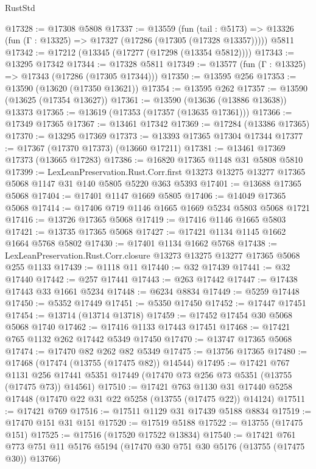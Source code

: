 \begin{lexlean}{RustStd}
\begin{coremodule}
@17328 := @17308 @5808
@17337 := @13559
    (fun (tail : @5173) => @13326 (fun (Γ : @13325) => @17327 (@17286 (@17305 (@17328 @13357)))))
    @5811
@17342 := @17212 (@13345 (@17277 (@17298 (@13354 @5812))))
@17343 := @13295 @17342
@17344 := @17328 @5811
@17349 := @13577 (fun (Γ : @13325) => @17343 (@17286 (@17305 @17344)))
@17350 := @13595 @256
@17353 := @13590 (@13620 (@17350 @13621))
@17354 := @13595 @262
@17357 := @13590 (@13625 (@17354 @13627))
@17361 := @13590 (@13636 (@13886 @13638)) @13373
@17365 := @13619 (@17353 (@17357 (@13635 @17361)))
@17366 := @17349 @17365
@17367 := @13461 @17342
@17369 := @17284 (@13386 @17365)
@17370 := @13295 @17369
@17373 := @13393 @17365 @17304 @17344
@17377 := @17367 (@17370 @17373) (@13660 @17211)
@17381 := @13461 @17369 @17373 (@13665 @17283)
@17386 := @16820 @17365 @1148 @31 @5808 @5810
@17399 := LexLeanPreservation.Rust.Corr.first
    @13273
    @13275
    @13277
    @17365
    @5068
    @1147
    @31
    @140
    @5805
    @5220
    @363
    @5393
@17401 := @13688 @17365 @5068
@17404 := @17401 @1147 @1669 @5805
@17406 := @14049 @17365 @5068
@17414 := @17406 @719 @1146 @1665 @1669 @5234 @5803 @5068 @1721
@17416 := @13726 @17365 @5068
@17419 := @17416 @1146 @1665 @5803
@17421 := @13735 @17365 @5068
@17427 := @17421 @1134 @1145 @1662 @1664 @5768 @5802
@17430 := @17401 @1134 @1662 @5768
@17438 := LexLeanPreservation.Rust.Corr.closure @13273 @13275 @13277 @17365 @5068 @255 @1133
@17439 := @1118 @11
@17440 := @32 @17439
@17441 := @32 @17440
@17442 := @257 @17441
@17443 := @263 @17442
@17447 := @17438 @17443 @33 @1661 @5234
@17448 := @6234 @8834
@17449 := @5259 @17448
@17450 := @5352 @17449
@17451 := @5350 @17450
@17452 := @17447 @17451
@17454 := @13714 (@13714 @13718)
@17459 := @17452 @17454 @30 @5068 @5068 @1740
@17462 := @17416 @1133 @17443 @17451
@17468 := @17421 @765 @1132 @262 @17442 @5349 @17450
@17470 := @13747 @17365 @5068
@17474 := @17470 @82 @262 @82 @5349
@17475 := @13756 @17365
@17480 := @17468 (@17474 (@13755 (@17475 @82)) @14544)
@17495 := @17421
    @767
    @1131
    @256
    @17441
    @5351
    @17449
    (@17470 @73 @256 @73 @5351 (@13755 (@17475 @73)) @14561)
@17510 := @17421
    @763
    @1130
    @31
    @17440
    @5258
    @17448
    (@17470 @22 @31 @22 @5258 (@13755 (@17475 @22)) @14124)
@17511 := @17421 @769
@17516 := @17511 @1129 @31 @17439 @5188 @8834
@17519 := @17470 @151 @31 @151
@17520 := @17519 @5188
@17522 := @13755 (@17475 @151)
@17525 := @17516 (@17520 @17522 @13834)
@17540 := @17421
    @761
    @773
    @751
    @11
    @5176
    @5194
    (@17470 @30 @751 @30 @5176 (@13755 (@17475 @30)) @13766)

\end{coremodule}
\end{lexlean}
